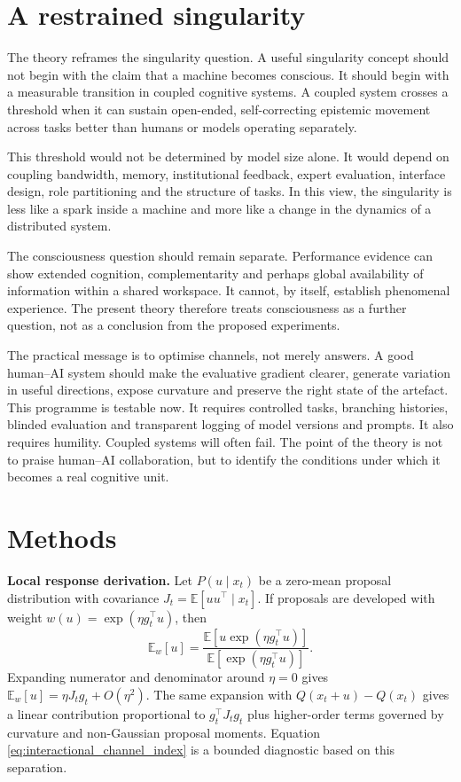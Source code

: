 \documentclass[11pt]{article}
\newcommand{\E}{\mathbb{E}}
\begin{document}
\section*{A restrained singularity}

The theory reframes the singularity question. A useful singularity concept should not begin with the claim that a machine becomes conscious. It should begin with a measurable transition in coupled cognitive systems. A coupled system crosses a threshold when it can sustain open-ended, self-correcting epistemic movement across tasks better than humans or models operating separately.

This threshold would not be determined by model size alone. It would depend on coupling bandwidth, memory, institutional feedback, expert evaluation, interface design, role partitioning and the structure of tasks. In this view, the singularity is less like a spark inside a machine and more like a change in the dynamics of a distributed system.

The consciousness question should remain separate. Performance evidence can show extended cognition, complementarity and perhaps global availability of information within a shared workspace. It cannot, by itself, establish phenomenal experience. The present theory therefore treats consciousness as a further question, not as a conclusion from the proposed experiments.

The practical message is to optimise channels, not merely answers. A good human--AI system should make the evaluative gradient clearer, generate variation in useful directions, expose curvature and preserve the right state of the artefact. This programme is testable now. It requires controlled tasks, branching histories, blinded evaluation and transparent logging of model versions and prompts. It also requires humility. Coupled systems will often fail. The point of the theory is not to praise human--AI collaboration, but to identify the conditions under which it becomes a real cognitive unit.

\section*{Methods}

\textbf{Local response derivation.} Let $P(u\mid x_t)$ be a zero-mean proposal distribution with covariance $J_t=\E[uu^\top\mid x_t]$. If proposals are developed with weight $w(u)=\exp(\eta g_t^\top u)$, then
\begin{equation}
    \E_w[u]=\frac{\E[u\exp(\eta g_t^\top u)]}{\E[\exp(\eta g_t^\top u)]}.
\end{equation}
Expanding numerator and denominator around $\eta=0$ gives $\E_w[u]=\eta J_tg_t+O(\eta^2)$. The same expansion with $Q(x_t+u)-Q(x_t)$ gives a linear contribution proportional to $g_t^\top J_tg_t$ plus higher-order terms governed by curvature and non-Gaussian proposal moments. Equation \ref{eq:interactional_channel_index} is a bounded diagnostic based on this separation.
\end{document}
